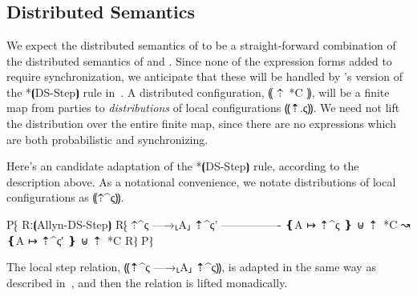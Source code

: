 
 \\

\begin{theorem}[PMTO\%]\label{thm:lang-pmto}
\end{theorem}

 \\

 \\

\subsection{Distributed Semantics}
\label{subsec:proposal-design-dist}

We expect the distributed semantics of \lang to be a straight-forward combination of the
distributed semantics of \mpc and \obliv. Since none of the expression forms added to
\lang require synchronization, we anticipate that these will be handled by \lang's version
of the *⦗DS-Step⦘ rule in~. A \lang distributed configuration, ⸨ ⇡~*C ⸩,
will be a finite map from parties to \emph{distributions} of local configurations ⸨⇡.ς⸩.
We need not lift the distribution over the entire finite map, since there are no expressions
which are both probabilistic and synchronizing.

Here's an candidate adaptation of the *⦗DS-Step⦘ rule, according to the description above. As
a notational convenience, we notate distributions of local configurations as ⸨⇡^ς⸩.

P⁅ Rː⦗Allyn-DS-Step⦘
   R⁅ ⇡^ς —→⸤A⸥ ⇡^{ς'}
      ----------------
      ❴A ↦ ⇡^ς ❵ ⊎ ⇡~*C ↝ ❴A ↦ ⇡^{ς′} ❵ ⊎ ⇡~*C
   R⁆
P⁆

The local step relation, ⸨⇡^ς —→⸤A⸥ ⇡^ς⸩, is adapted in the same way as described
in~, and then the relation is lifted monadically.

